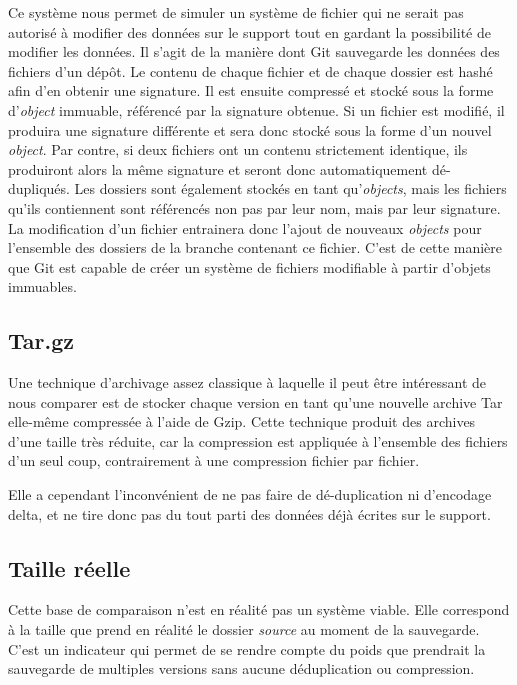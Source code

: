 \documentclass[a4paper]{report}
\begin{document}
Ce système nous permet de simuler un système de fichier qui ne serait
pas autorisé à modifier des données sur le support tout en gardant la
possibilité de modifier les données. Il s'agit de la manière dont Git
sauvegarde les données des fichiers d'un dépôt. Le contenu de chaque
fichier et de chaque dossier est hashé afin d'en obtenir une signature.
Il est ensuite compressé et stocké sous la forme d'\emph{object}
immuable, référencé par la signature obtenue. Si un fichier est modifié,
il produira une signature différente et sera donc stocké sous la forme
d'un nouvel \emph{object}. Par contre, si deux fichiers ont un contenu
strictement identique, ils produiront alors la même signature et seront
donc automatiquement dé-dupliqués. Les dossiers sont également stockés
en tant qu'\emph{objects}, mais les fichiers qu'ils contiennent sont
référencés non pas par leur nom, mais par leur signature. La
modification d'un fichier entrainera donc l'ajout de nouveaux
\emph{objects} pour l'ensemble des dossiers de la branche contenant ce
fichier. C'est de cette manière que Git est capable de créer un système
de fichiers modifiable à partir d'objets immuables.

\subsection{Tar.gz}

Une technique d'archivage assez classique à laquelle il peut être
intéressant de nous comparer est de stocker chaque version en tant
qu'une nouvelle archive Tar elle-même compressée à l'aide de Gzip. Cette
technique produit des archives d'une taille très réduite, car la
compression est appliquée à l'ensemble des fichiers d'un seul coup,
contrairement à une compression fichier par fichier.

Elle a cependant l'inconvénient de ne pas faire de dé-duplication ni
d'encodage delta, et ne tire donc pas du tout parti des données déjà
écrites sur le support.

\subsection{Taille réelle}

Cette base de comparaison n'est en réalité pas un système viable. Elle
correspond à la taille que prend en réalité le dossier \emph{source} au
moment de la sauvegarde. C'est un indicateur qui permet de se rendre
compte du poids que prendrait la sauvegarde de multiples versions sans
aucune déduplication ou compression.
\end{document}

